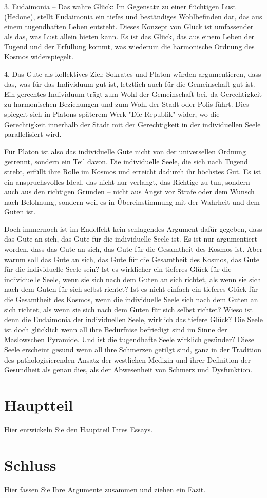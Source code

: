 \documentclass[12pt,a4paper]{article}
\begin{document}
3. Eudaimonia – Das wahre Glück: Im Gegensatz zu einer flüchtigen Lust (Hedone), stellt Eudaimonia ein tiefes und beständiges Wohlbefinden dar, das aus einem tugendhaften Leben entsteht. Dieses Konzept von Glück ist umfassender als das, was Lust allein bieten kann. Es ist das Glück, das aus einem Leben der Tugend und der Erfüllung kommt, was wiederum die harmonische Ordnung des Kosmos widerspiegelt.

4. Das Gute als kollektives Ziel: Sokrates und Platon würden argumentieren, dass das, was für das Individuum gut ist, letztlich auch für die Gemeinschaft gut ist. Ein gerechtes Individuum trägt zum Wohl der Gemeinschaft bei, da Gerechtigkeit zu harmonischen Beziehungen und zum Wohl der Stadt oder Polis führt. Dies spiegelt sich in Platons späterem Werk "Die Republik" wider, wo die Gerechtigkeit innerhalb der Stadt mit der Gerechtigkeit in der individuellen Seele parallelisiert wird.

Für Platon ist also das individuelle Gute nicht von der universellen Ordnung getrennt, sondern ein Teil davon. Die individuelle Seele, die sich nach Tugend strebt, erfüllt ihre Rolle im Kosmos und erreicht dadurch ihr höchstes Gut. Es ist ein anspruchsvolles Ideal, das nicht nur verlangt, das Richtige zu tun, sondern auch aus den richtigen Gründen – nicht aus Angst vor Strafe oder dem Wunsch nach Belohnung, sondern weil es in Übereinstimmung mit der Wahrheit und dem Guten ist.

Doch immernoch ist im Endeffekt kein schlagendes Argument dafür gegeben, dass das Gute an sich, das Gute für die individuelle Seele ist. Es ist nur argumentiert worden, dass das Gute an sich, das Gute für die Gesamtheit des Kosmos ist. Aber warum soll das Gute an sich, das Gute für die Gesamtheit des Kosmos, das Gute für die individuelle Seele sein? Ist es wirklicher ein tieferes Glück für die individuelle Seele, wenn sie sich nach dem Guten an sich richtet, als wenn sie sich nach dem Guten für sich selbst richtet? Ist es nicht einfach ein tieferes Glück für die Gesamtheit des Kosmos, wenn die individuelle Seele sich nach dem Guten an sich richtet, als wenn sie sich nach dem Guten für sich selbst richtet? Wieso ist denn die Eudaimonia der individuellen Seele, wirklich das tiefere Glück? Die Seele ist doch glücklich wenn all ihre Bedürfnise befriedigt sind im Sinne der Maslowschen Pyramide. Und ist die tugendhafte Seele wirklich gesünder? Diese Seele erscheint gesund wenn all ihre Schmerzen getilgt sind, ganz in der Tradition des pathologisierenden Ansatz der westlichen Medizin und ihrer Definition der Gesundheit als genau dies, als der Abwesenheit von Schmerz und Dysfunktion.

\section{Hauptteil}
Hier entwickeln Sie den Hauptteil Ihres Essays. \cite{plato_kriton}

\section{Schluss}
Hier fassen Sie Ihre Argumente zusammen und ziehen ein Fazit. \cite{plato_menon}

\printbibliography
\end{document}
